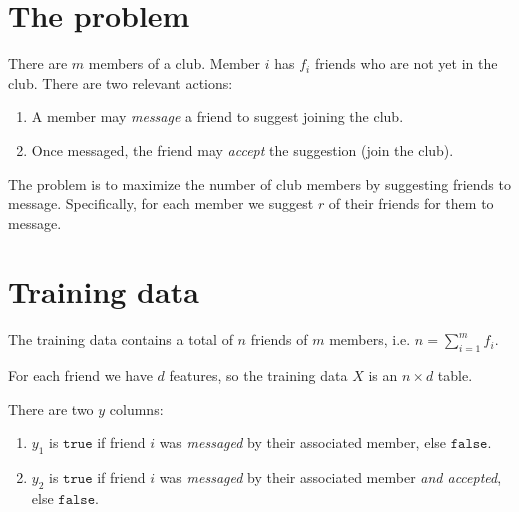 \documentclass[12pt]{article}
\newcommand{\true}{\texttt{true}}
\newcommand{\false}{\texttt{false}}
\begin{document}
\section*{The problem}
There are $m$ members of a club. Member $i$ has $f_i$ friends who are not yet in the club. There
are two relevant actions:
\begin{enumerate}
\item A member may {\it message} a friend to suggest joining the club.
\item Once messaged, the friend may {\it accept} the suggestion (join the club).
\end{enumerate}
The problem is to maximize the number of club members by suggesting friends to
message. Specifically, for each member we suggest $r$ of their friends for them to message.

\section*{Training data}

The training data contains a total of $n$ friends of $m$ members, i.e. $n = \sum_{i=1}^m f_i$.

For each friend we have $d$ features, so the training data $X$ is an $n \times d$ table.

There are two $y$ columns:
\begin{enumerate}
\item $y_1$ is $\true$ if friend $i$ was {\it messaged} by their associated member, else $\false$.
\item $y_2$ is $\true$ if friend $i$ was {\it messaged} by their associated member {\it and
    accepted}, else $\false$.
\end{enumerate}
\end{document}
